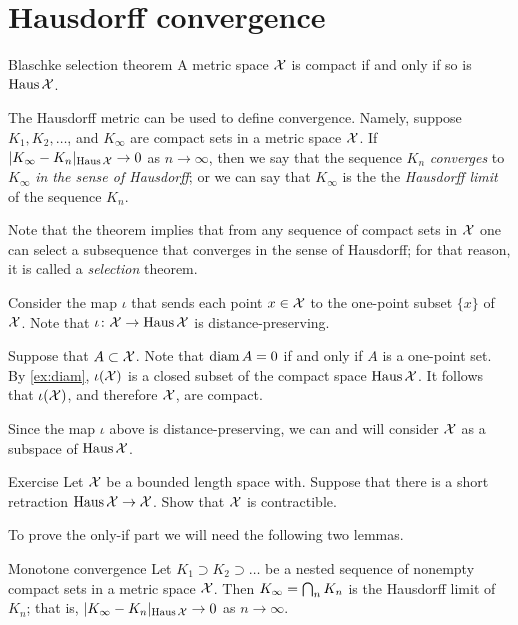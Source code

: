 \section{Hausdorff convergence}

\begin{thm}{Blaschke selection theorem}\label{thm:compact+Hausdorff}
A metric space $\mathcal{X}$ is compact if and only if
so is $\operatorname{\rm Haus}\nolimits\mathcal{X}$.
\end{thm}

The Hausdorff metric can be used to define convergence.
Namely, suppose $K_1,K_2,\dots$, and $K_\infty$ are compact sets in a metric space $\mathcal{X}$.
If $|K_\infty-K_n|_{\operatorname{\rm Haus}\nolimits\mathcal{X}}\to0$ as $n\to\infty$, then we say that 
the sequence $K_n$ {}\emph{converges} to $K_\infty$ \emph{in the sense of Hausdorff};
or we can say that $K_\infty$ is the the {}\emph{Hausdorff limit} of the sequence $K_n$.

Note that the theorem implies that from any sequence of compact sets in $\mathcal{X}$ one can select a subsequence that converges in the sense of Hausdorff; 
for that reason, it is called a \textit{selection} theorem. 

Consider the map $\iota$ that sends each point $x\in \mathcal{X}$ to the one-point subset $\{x\}$ of $\mathcal{X}$.
Note that $\iota\colon\mathcal{X}\to \operatorname{\rm Haus}\nolimits\mathcal{X}$ is distance-preserving.

Suppose that $A\subset \mathcal{X}$.
Note that $\operatorname{\rm diam}\nolimits A=0$ if and only if $A$ is a one-point set.
By \ref{ex:diam}, $\iota(\mathcal{X})$ is a closed subset of the compact space $\operatorname{\rm Haus}\nolimits\mathcal{X}$.
It follows that $\iota(\mathcal{X})$, and therefore $\mathcal{X}$, are compact.
\qeds

Since the map $\iota$ above is distance-preserving, we can and will consider $\mathcal{X}$ as a subspace of $\operatorname{\rm Haus}\nolimits\mathcal{X}$.

\begin{thm}{Exercise}\label{ex:haus-contractible}
Let $\mathcal{X}$ be a bounded length space with.
Suppose that there is a short retraction $\operatorname{\rm Haus}\nolimits\mathcal{X}\to \mathcal{X}$.
Show that $\mathcal{X}$ is contractible.
\end{thm}


To prove the only-if part we will need the following two lemmas.

\begin{thm}{Monotone convergence}\label{lem:decreasing-converges}
Let $K_1\supset K_2\supset\dots$ be a nested sequence of nonempty compact sets in a metric space $\mathcal{X}$.
Then $K_\infty\z=\bigcap_n K_n$ is the Hausdorff limit of $K_n$;
that is, $|K_\infty-K_n|_{\operatorname{\rm Haus}\nolimits\mathcal{X}}\to0$ as $n\to\infty$.
\end{thm}

